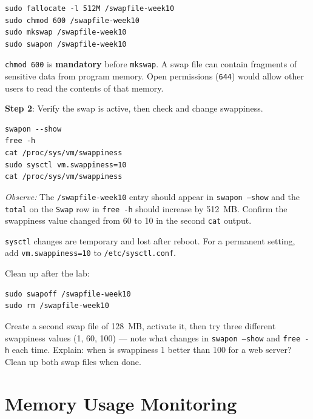 \begin{lstlisting}[caption={Creating and activating swap}]
sudo fallocate -l 512M /swapfile-week10
sudo chmod 600 /swapfile-week10
sudo mkswap /swapfile-week10
sudo swapon /swapfile-week10
\end{lstlisting}

\begin{warningbox}
\texttt{chmod 600} is \textbf{mandatory} before \texttt{mkswap}. A swap file can
contain fragments of sensitive data from program memory. Open permissions
(\texttt{644}) would allow other users to read the contents of that memory.
\end{warningbox}

\textbf{Step 2}: Verify the swap is active, then check and change swappiness.

\begin{lstlisting}[caption={Verify and set swappiness}]
swapon --show
free -h
cat /proc/sys/vm/swappiness
sudo sysctl vm.swappiness=10
cat /proc/sys/vm/swappiness
\end{lstlisting}

\textit{Observe:} The \texttt{/swapfile-week10} entry should appear in
\texttt{swapon --show} and the \texttt{total} on the \texttt{Swap} row in
\texttt{free -h} should increase by 512~MB. Confirm the swappiness value changed
from 60 to 10 in the second \texttt{cat} output.

\begin{notebox}
\texttt{sysctl} changes are temporary and lost after reboot. For a permanent
setting, add \texttt{vm.swappiness=10} to \texttt{/etc/sysctl.conf}.

Clean up after the lab:
\begin{lstlisting}
sudo swapoff /swapfile-week10
sudo rm /swapfile-week10
\end{lstlisting}
\end{notebox}

\begin{challengebox}
Create a second swap file of 128~MB, activate it, then try three different
swappiness values (1, 60, 100) --- note what changes in \texttt{swapon --show}
and \texttt{free -h} each time. Explain: when is swappiness 1 better than 100
for a web server? Clean up both swap files when done.
\end{challengebox}

\section{Memory Usage Monitoring}

